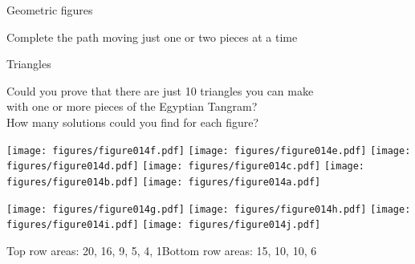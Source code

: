 \documentclass[14pt]{beamer}
\begin{document}
\begin{frame}{Geometric figures}
\begin{center}
            \smallskip

            {\small Complete the path moving just one or two pieces at a time}
        \end{center}
    \end{frame}


    \begin{frame}{Triangles}

        \vspace{-0.5em}
        \begin{center}
            {\small Could you prove that there are just 10 triangles you can make\\with one or more pieces of the Egyptian Tangram?\\How many solutions could you find for each figure?}

            \bigskip\bigskip

            \texttt{[image: figures/figure014f.pdf]}\quad
            \texttt{[image: figures/figure014e.pdf]}\quad
            \texttt{[image: figures/figure014d.pdf]}\quad
            \texttt{[image: figures/figure014c.pdf]}\quad
            \texttt{[image: figures/figure014b.pdf]}\quad
            \texttt{[image: figures/figure014a.pdf]}\\\bigskip\bigskip

            \texttt{[image: figures/figure014g.pdf]}\quad
            \texttt{[image: figures/figure014h.pdf]}\quad
            \texttt{[image: figures/figure014i.pdf]}\quad
            \texttt{[image: figures/figure014j.pdf]}\\

            \bigskip

            {\footnotesize Top row areas: 20, 16, 9, 5, 4, 1\qquad Bottom row areas: 15, 10, 10, 6}
        \end{center}
    \end{frame}

\end{document}
